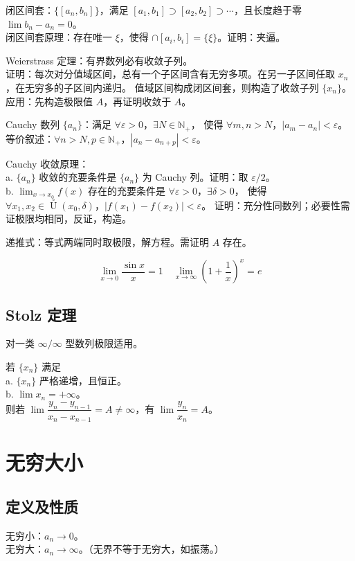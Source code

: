 \documentclass[12pt, a4paper, UTF8, openany]{ctexbook}
\newcommand{\field}[1]{\mathbb{#1}}%
\newcommand{\uzero}{\mathop{U}\limits^{\circ}}%
\newcommand{\eps}{\varepsilon}
\begin{document}
        闭区间套：$\{[a_n, b_n]\}$，满足 $[a_1, b_1] \supset [a_2, b_2] \supset \cdots$，且长度趋于零 $\lim b_n - a_n = 0$。\\
        闭区间套原理：存在{\heiti 唯一} $\xi$，使得 $\cap [a_i, b_i] = \{\xi\}$。证明：夹逼。

        Weierstrass 定理：有界数列必有收敛子列。\\
        证明：每次对分值域区间，总有一个子区间含有无穷多项。在另一子区间任取 $x_n$，在无穷多的子区间内递归。
        值域区间构成闭区间套，则构造了收敛子列 $\{x_n\}$。\\
        {\heiti 应用}：先构造极限值 $A$，再证明收敛于 $A$。

        Cauchy 数列 $\{a_n\}$：满足 $\forall \eps > 0$，$\exists N \in \field{N}_+$，
        使得 $\forall m, n > N$，$|a_m - a_n| < \eps$。\\
        等价叙述：$\forall n > N, p \in \field{N}_+$，$|a_n - a_{n + p}| < \eps$。

        Cauchy 收敛原理：\\
        a. $\{a_n\}$ 收敛的充要条件是 $\{a_n\}$ 为 Cauchy 列。证明：取 $\eps / 2$。\\
        b. $\lim_{x \to x_0} f(x)$ 存在的充要条件是 $\forall \eps > 0$，$\exists \delta > 0$，
        使得 $\forall x_1, x_2 \in \uzero(x_0, \delta)$，$|f(x_1) - f(x_2)| < \eps$。
        证明：充分性同数列；必要性需证极限均相同，反证，构造。

        {\heiti 递推式}：等式两端同时取极限，解方程。需证明 $A$ 存在。

        $$\lim_{x \to 0} \frac{\sin x}{x} = 1 \quad \lim_{x \to \infty} (1 + \frac{1}{x})^x = e$$

        \subsection{Stolz 定理}
        对一类 $\infty / \infty$ 型数列极限适用。

        若 $\{x_n\}$ 满足\\
        a. $\{x_n\}$ 严格递增，且恒正。\\
        b. $\lim x_n = +\infty$。\\
        则若 $\lim \dfrac{y_n - y_{n - 1}}{x_n - x_{n - 1}} = A \neq \infty$，有 $\lim \dfrac{y_n}{x_n} = A$。

    \section{无穷大小}
        \subsection{定义及性质}
        无穷小：$a_n \to 0$。\\
        无穷大：$a_n \to \infty$。（无界不等于无穷大，如振荡。）
\end{document}

